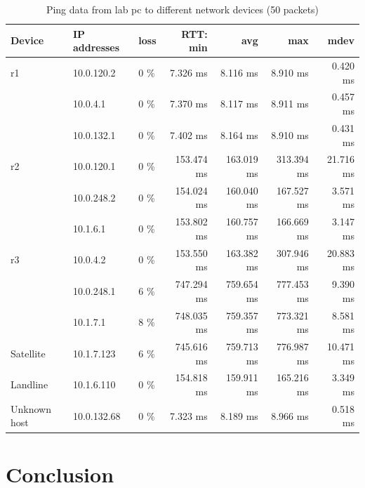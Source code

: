 \documentclass[parskip=full]{scrartcl}
\begin{document}
\begin{table}[hb]
	\centering
	\begin{tabular}{|lllrrrr|}
		\hline
		\textbf{Device} & \textbf{IP addresses} & \textbf{loss} &\textbf{RTT: min} & \textbf{avg} & \textbf{max }& \textbf{mdev}  \\ 
		\hline
		r1 	& 10.0.120.2 & 0 \% & 7.326 ms& 8.116 ms& 8.910 ms& 0.420 ms\\
		 	& 10.0.4.1 & 0 \% & 7.370 ms & 8.117 ms & 8.911 ms & 0.457 ms\\
		 	& 10.0.132.1 & 0 \% & 7.402 ms & 8.164 ms & 8.910 ms & 0.431 ms\\
		\hline
		r2	& 10.0.120.1 & 0 \% & 153.474 ms & 163.019 ms & 313.394 ms & 21.716 ms\\
			& 10.0.248.2 & 0 \% & 154.024 ms & 160.040 ms & 167.527 ms & 3.571 ms\\
			& 10.1.6.1 & 0 \% & 153.802 ms & 160.757 ms & 166.669 ms & 3.147 ms\\
		\hline
		r3	& 10.0.4.2 & 0 \% & 153.550 ms & 163.382 ms & 307.946 ms & 20.883 ms\\
			& 10.0.248.1 & 6 \% & 747.294 ms & 759.654 ms & 777.453 ms & 9.390 ms\\
			& 10.1.7.1 & 8 \% & 748.035 ms & 759.357 ms & 773.321 ms & 8.581 ms\\
		\hline
		Satellite & 10.1.7.123 & 6 \% & 745.616 ms & 759.713 ms & 776.987 ms & 10.471 ms \\
		\hline
		Landline & 10.1.6.110 & 0 \% & 154.818 ms & 159.911 ms & 165.216 ms & 3.349 ms \\
		\hline
		Unknown host & 10.0.132.68 & 0 \% & 7.323 ms & 8.189 ms & 8.966 ms & 0.518 ms\\
		\hline
	\end{tabular}
	\caption{Ping data from lab pc to different network devices (50 packets)}
	\label{tab:ping}
\end{table}


\newpage
\section{Conclusion}


\printbibliography
\end{document}
